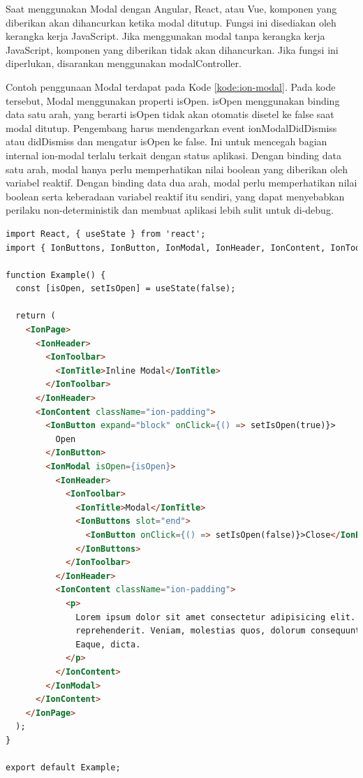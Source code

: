 Saat menggunakan Modal dengan Angular, React, atau Vue, komponen yang diberikan akan dihancurkan ketika modal ditutup. Fungsi ini disediakan oleh kerangka kerja JavaScript. Jika menggunakan modal tanpa kerangka kerja JavaScript, komponen yang diberikan tidak akan dihancurkan. Jika fungsi ini diperlukan, disarankan menggunakan modalController.

Contoh penggunaan Modal terdapat pada Kode \ref{kode:ion-modal}. Pada kode tersebut, Modal menggunakan properti isOpen. isOpen menggunakan binding data satu arah, yang berarti isOpen tidak akan otomatis disetel ke false saat modal ditutup. Pengembang harus mendengarkan event ionModalDidDismiss atau didDismiss dan mengatur isOpen ke false. Ini untuk mencegah bagian internal ion-modal terlalu terkait dengan status aplikasi. Dengan binding data satu arah, modal hanya perlu memperhatikan nilai boolean yang diberikan oleh variabel reaktif. Dengan binding data dua arah, modal perlu memperhatikan nilai boolean serta keberadaan variabel reaktif itu sendiri, yang dapat menyebabkan perilaku non-deterministik dan membuat aplikasi lebih sulit untuk di-debug.
\begin{lstlisting}[language=HTML, caption=Contoh Kode Penggunaan Modal, label=kode:ion-modal]
import React, { useState } from 'react';
import { IonButtons, IonButton, IonModal, IonHeader, IonContent, IonToolbar, IonTitle, IonPage } from '@ionic/react';

function Example() {
  const [isOpen, setIsOpen] = useState(false);

  return (
    <IonPage>
      <IonHeader>
        <IonToolbar>
          <IonTitle>Inline Modal</IonTitle>
        </IonToolbar>
      </IonHeader>
      <IonContent className="ion-padding">
        <IonButton expand="block" onClick={() => setIsOpen(true)}>
          Open
        </IonButton>
        <IonModal isOpen={isOpen}>
          <IonHeader>
            <IonToolbar>
              <IonTitle>Modal</IonTitle>
              <IonButtons slot="end">
                <IonButton onClick={() => setIsOpen(false)}>Close</IonButton>
              </IonButtons>
            </IonToolbar>
          </IonHeader>
          <IonContent className="ion-padding">
            <p>
              Lorem ipsum dolor sit amet consectetur adipisicing elit. Magni illum quidem recusandae ducimus quos
              reprehenderit. Veniam, molestias quos, dolorum consequuntur nisi deserunt omnis id illo sit cum qui.
              Eaque, dicta.
            </p>
          </IonContent>
        </IonModal>
      </IonContent>
    </IonPage>
  );
}

export default Example;
\end{lstlisting}

